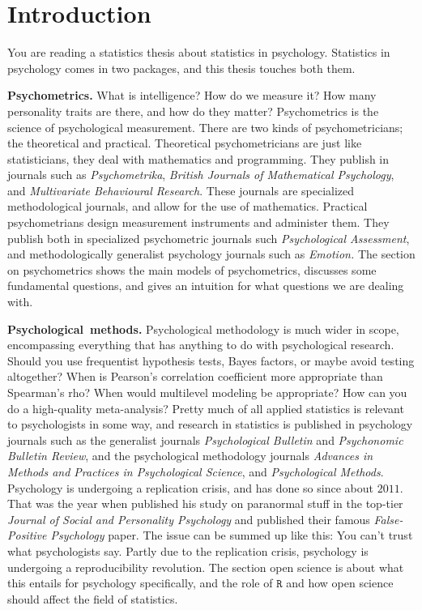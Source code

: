 \section{Introduction}

You are reading a statistics thesis about statistics in psychology. Statistics in psychology comes in two packages, and this thesis touches both them.

\textbf{Psychometrics.} What is intelligence? How do we measure it? How many personality traits are there, and how do they matter? Psychometrics is the science of psychological measurement. There are two kinds of psychometricians; the theoretical and practical. Theoretical psychometricians are just like statisticians, they deal with mathematics and programming. They publish in journals such as \textit{Psychometrika}, \textit{British Journals of Mathematical Psychology}, and \textit{Multivariate Behavioural Research}. These journals are specialized methodological journals, and allow for the use of mathematics. Practical psychometrians design measurement instruments and administer them. They publish both in specialized psychometric journals such \textit{Psychological Assessment}, and methodologically generalist psychology journals such as \textit{Emotion.} The section on psychometrics shows the main models of psychometrics, discusses some fundamental questions, and gives an intuition for what questions we are dealing with.

\textbf{Psychological~methods.} Psychological methodology is much wider in scope, encompassing everything that has anything to do with psychological research. Should you use frequentist hypothesis tests, Bayes factors, or maybe avoid testing altogether? When is Pearson's correlation coefficient more appropriate than Spearman's rho? When would multilevel modeling be appropriate? How can you do a high-quality meta-analysis? Pretty much of all applied statistics is relevant to psychologists in some way, and research in statistics is published in psychology journals such as the generalist journals \textit{Psychological Bulletin} and \textit{Psychonomic Bulletin Review}, and the psychological methodology journals \textit{Advances in Methods and Practices in Psychological Science}, and \textit{Psychological Methods}. Psychology is undergoing a replication crisis, and has done so since about $2011$. That was the year when \textcite{Bem2011-vq} published his study on paranormal stuff in the top-tier \textit{Journal of Social and Personality Psychology} and \textcite{simmons_false-positive_2011} published their famous \textit{False-Positive Psychology} paper. The issue can be summed up like this: You can't trust what psychologists say. Partly due to the replication crisis, psychology is undergoing a reproducibility revolution. The section open science is about what this entails for psychology specifically, and the role of $\mathtt{R}$
and how open science should affect the field of statistics. 

